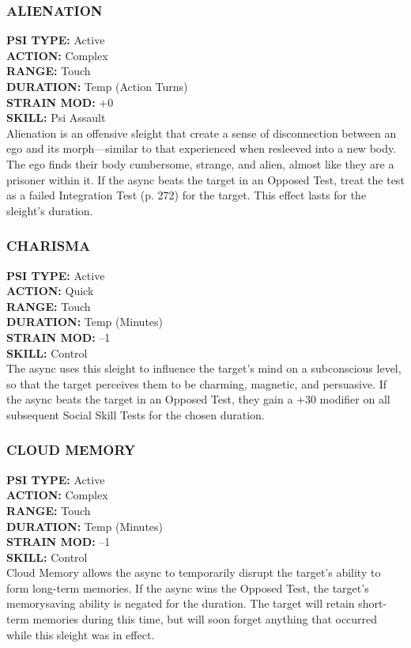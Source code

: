\subsubsection{ALIENATION} \textbf{PSI TYPE:} Active \\ \textbf{ACTION:} Complex \\ \textbf{RANGE:} Touch \\ \textbf{DURATION:} Temp (Action Turns) \\ \textbf{STRAIN MOD:} +0 \\ \textbf{SKILL:} Psi Assault \\ Alienation is an offensive sleight that create a sense of disconnection between an ego and its morph—similar to that experienced when resleeved into a new body. The ego finds their body cumbersome, strange, and alien, almost like they are a prisoner within it. If the async beats the target in an Opposed Test, treat the test as a failed Integration Test (p. 272) for the target. This effect lasts for the sleight’s duration. 

\subsubsection{CHARISMA} \textbf{PSI TYPE:} Active \\ \textbf{ACTION:} Quick \\ \textbf{RANGE:} Touch \\ \textbf{DURATION:} Temp (Minutes) \\ \textbf{STRAIN MOD:} –1 \\ \textbf{SKILL:} Control\\ The async uses this sleight to influence the target’s mind on a subconscious level, so that the target perceives them to be charming, magnetic, and persuasive. If the async beats the target in an Opposed Test, they gain a +30 modifier on all subsequent Social Skill Tests for the chosen duration. 

\subsubsection{CLOUD MEMORY} \textbf{PSI TYPE:} Active \\ \textbf{ACTION:} Complex \\ \textbf{RANGE:} Touch \\ \textbf{DURATION:} Temp (Minutes) \\ \textbf{STRAIN MOD:} –1 \\ \textbf{SKILL:} Control\\ Cloud Memory allows the async to temporarily disrupt the target’s ability to form long-term memories. If the async wins the Opposed Test, the target’s memorysaving ability is negated for the duration. The target will retain short-term memories during this time, but will soon forget anything that occurred while this sleight was in effect. 

